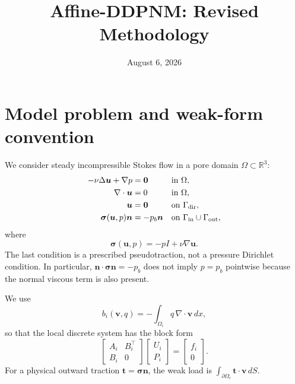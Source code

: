 \documentclass[11pt,a4paper]{article}
\newcommand{\R}{\mathbb{R}}
\newcommand{\dom}{\Omega}
\newcommand{\pore}[1]{\Omega_{#1}}
\newcommand{\vel}{\bm{u}}
\newcommand{\pres}{p}
\newcommand{\stress}{\bm{\sigma}}
\newcommand{\normal}{\bm{n}}
\newcommand{\zero}{\bm{0}}
\begin{document}
\title{\textbf{Affine-DDPNM: Revised Methodology}}
\author{}
\date{August 6, 2026}
\maketitle

\begin{center}
\end{center}

\section{Model problem and weak-form convention}

We consider steady incompressible Stokes flow in a pore domain
$\dom\subset\R^3$:
\begin{align}
 -\nu\Delta\vel+\nabla\pres&=\zero &&\text{in }\dom,\\
 \nabla\cdot\vel&=0 &&\text{in }\dom,\\
 \vel&=\zero &&\text{on }\Gamma_{\rm dir},\\
 \stress(\vel,\pres)\normal&=-p_b\normal
 &&\text{on }\Gamma_{\rm in}\cup\Gamma_{\rm out},
\end{align}
where
\[
  \stress(\vel,\pres)=-\pres I+\nu\nabla\vel.
\]
The last condition is a prescribed pseudotraction, not a pressure Dirichlet
condition.  In particular, $\normal\cdot\stress\normal=-p_b$ does not imply
$\pres=p_b$ pointwise because the normal viscous term is also present.

We use
\[
 b_i(\bm v,q)=-\int_{\pore{i}}q\,\nabla\cdot\bm v\,dx,
\]
so that the local discrete system has the block form
\[
 \begin{bmatrix}A_i&B_i^\top\\B_i&0\end{bmatrix}
 \begin{bmatrix}U_i\\P_i\end{bmatrix}
 =\begin{bmatrix}f_i\\0\end{bmatrix}.
\]
For a physical outward traction $\bm t=\stress\normal$, the weak load is
$\int_{\partial\pore{i}}\bm t\cdot\bm v\,dS$.
\end{document}
